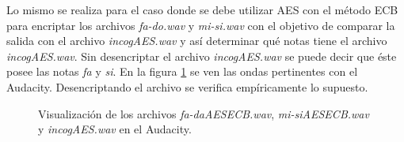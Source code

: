 \documentclass[a4paper,10pt]{article}
\begin{document}
Lo mismo se realiza para el caso donde se debe utilizar AES con el m\'etodo ECB para encriptar
los archivos \emph{fa-do.wav} y \emph{mi-si.wav} con el objetivo de comparar la salida
con el archivo \emph{incogAES.wav} y as\'i determinar qu\'e notas tiene el archivo
\emph{incogAES.wav}. Sin desencriptar el archivo \emph{incogAES.wav} se puede decir que \'este
posee las notas \emph{fa} y \emph{si}. En la figura \ref{fig:AESAudacityCmp} se ven las ondas
pertinentes con el Audacity. Desencriptando el archivo se verifica empíricamente lo supuesto.
\begin{figure}
	\begin{center}
	\end{center}
	\caption{Visualización de los archivos \emph{fa-daAESECB.wav}, \emph{mi-siAESECB.wav} y
		\emph{incogAES.wav} en el Audacity.}
	\label{fig:AESAudacityCmp}
\end{figure}
\end{document}
